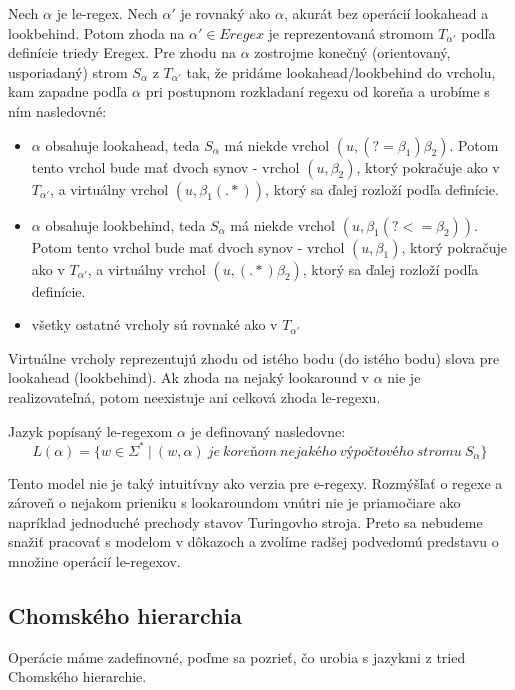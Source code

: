 \begin{df}
Nech $\alpha$ je le-regex. Nech $\alpha '$ je rovnaký ako $\alpha$, akurát bez operácií lookahead a lookbehind. Potom zhoda na $\alpha ' \in Eregex$ je reprezentovaná stromom $T_{\alpha '}$ podľa definície triedy Eregex. Pre zhodu na $\alpha$ zostrojme konečný (orientovaný, usporiadaný) strom $S_\alpha$ z $T_{\alpha '}$ tak, že pridáme lookahead/lookbehind do vrcholu, kam zapadne podľa $\alpha$ pri postupnom rozkladaní regexu od koreňa a urobíme s ním nasledovné:
\begin{itemize}
  \item  $\alpha$ obsahuje lookahead, teda $S_\alpha$ má niekde vrchol $(u, (?=\beta_1 )\beta_2)$. Potom tento vrchol bude mať dvoch synov - vrchol $(u,\beta_2)$, ktorý pokračuje ako v $T_{\alpha '}$, a virtuálny vrchol $(u,\beta_1 (.*))$, ktorý sa ďalej rozloží podľa definície.
  \item  $\alpha$ obsahuje lookbehind, teda $S_\alpha$ má niekde vrchol $(u, \beta_1(?<=\beta_2))$. Potom tento vrchol bude mať dvoch synov - vrchol $(u,\beta_1)$, ktorý pokračuje ako v $T_{\alpha '}$, a virtuálny vrchol $(u,(.*)\beta_2)$, ktorý sa ďalej rozloží podľa definície.
  \item všetky ostatné vrcholy sú rovnaké ako v $T_{\alpha '}$
\end{itemize}
Virtuálne vrcholy reprezentujú zhodu od istého bodu (do istého bodu) slova pre lookahead (lookbehind). Ak zhoda na nejaký lookaround v $\alpha$ nie je realizovateľná, potom neexistuje ani celková zhoda le-regexu.
\end{df}
\begin{df}
Jazyk popísaný le-regexom $\alpha$ je definovaný nasledovne: 
$$L(\alpha ) = \lbrace w \in \Sigma ^* ~|~ (w, \alpha)~je~koreňom~nejakého~výpočtového~stromu~S_\alpha \rbrace$$
\end{df}

Tento model nie je taký intuitívny ako verzia pre e-regexy. Rozmýšľať o regexe a zároveň o nejakom prieniku s lookaroundom vnútri nie je priamočiare ako napríklad jednoduché prechody stavov Turingovho stroja. Preto sa nebudeme snažiť pracovať s modelom v dôkazoch a zvolíme radšej podvedomú predstavu o množine operácií le-regexov.

\subsection{Chomského hierarchia}

Operácie máme zadefinovné, poďme sa pozrieť, čo urobia s jazykmi z tried Chomského hierarchie.

